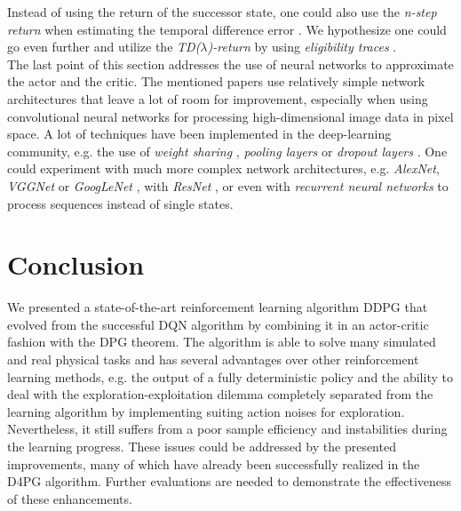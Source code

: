Instead of using the return of the successor state, one could also use the \textit{n-step return} when estimating the temporal difference error \citep{barth2018distributed}. We hypothesize one could go even further and utilize the \textit{TD($\lambda$)-return} by using \textit{eligibility traces} \citep{tesauro1995temporal}.\\
The last point of this section addresses the use of neural networks to approximate the actor and the critic. The mentioned papers use relatively simple network architectures that leave a lot of room for improvement, especially when using convolutional neural networks for processing high-dimensional image data in pixel space. A lot of techniques have been implemented in the deep-learning community, e.g. the use of \textit{weight sharing} \citep{nowlan1992simplifying}, \textit{pooling layers} \citep{zeiler2013stochastic} or \textit{dropout layers} \citep{srivastava2014dropout}. One could experiment with much more complex network architectures, e.g. \textit{AlexNet}, \textit{VGGNet} or \textit{GoogLeNet} \citep{szegedy2015going}, with \textit{ResNet} \citep{he2016deep}, or even with \textit{recurrent neural networks} \citep{haykin1994neural} to process sequences instead of single states. 


\section{Conclusion}
\label{sec:conclusion}
We presented a state-of-the-art reinforcement learning algorithm DDPG that evolved from the successful DQN algorithm by combining it in an actor-critic fashion with the DPG theorem. The algorithm is able to solve many simulated and real physical tasks and has several advantages over other reinforcement learning methods, e.g. the output of a fully deterministic policy and the ability to deal with the exploration-exploitation dilemma completely separated from the learning algorithm by implementing suiting action noises for exploration. Nevertheless, it still suffers from a poor sample efficiency and instabilities during the learning progress. These issues could be addressed by the presented improvements, many of which have already been successfully realized in the D4PG algorithm. Further evaluations are needed to demonstrate the effectiveness of these enhancements.

\newpage




